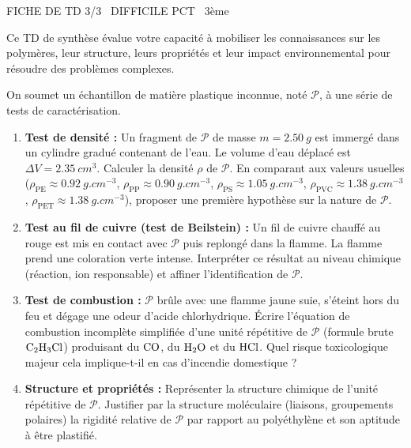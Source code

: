\documentclass[11pt]{article}
\begin{document}
\begin{tcolorbox}[enhanced,colback=popink,colframe=popink,arc=10pt,boxrule=0pt,left=12pt,right=12pt,top=9pt,bottom=9pt]
{\color{white}\popxbold\small FICHE DE TD 3/3 \textbullet\ DIFFICILE \hfill PCT \textbullet\ 3ème\par}
\end{tcolorbox}
\vspace{4pt}
Ce TD de synthèse évalue votre capacité à mobiliser les connaissances sur les polymères, leur structure, leurs propriétés et leur impact environnemental pour résoudre des problèmes complexes.

\begin{exercice}
On soumet un échantillon de matière plastique inconnue, noté $\mathcal{P}$, à une série de tests de caractérisation.
\begin{enumerate}
    \item \textbf{Test de densité :} Un fragment de $\mathcal{P}$ de masse $m = \SI{2,50}{g}$ est immergé dans un cylindre gradué contenant de l'eau. Le volume d'eau déplacé est $\Delta V = \SI{2,35}{cm^3}$. Calculer la densité $\rho$ de $\mathcal{P}$. En comparant aux valeurs usuelles ($\rho_{\text{PE}} \approx \SI{0,92}{g.cm^{-3}}$, $\rho_{\text{PP}} \approx \SI{0,90}{g.cm^{-3}}$, $\rho_{\text{PS}} \approx \SI{1,05}{g.cm^{-3}}$, $\rho_{\text{PVC}} \approx \SI{1,38}{g.cm^{-3}}$, $\rho_{\text{PET}} \approx \SI{1,38}{g.cm^{-3}}$), proposer une première hypothèse sur la nature de $\mathcal{P}$.
    \item \textbf{Test au fil de cuivre (test de Beilstein) :} Un fil de cuivre chauffé au rouge est mis en contact avec $\mathcal{P}$ puis replongé dans la flamme. La flamme prend une coloration verte intense. Interpréter ce résultat au niveau chimique (réaction, ion responsable) et affiner l'identification de $\mathcal{P}$.
    \item \textbf{Test de combustion :} $\mathcal{P}$ brûle avec une flamme jaune suie, s'éteint hors du feu et dégage une odeur d'acide chlorhydrique. Écrire l'équation de combustion incomplète simplifiée d'une unité répétitive de $\mathcal{P}$ (formule brute $\ce{C2H3Cl}$) produisant du $\ce{CO}$, du $\ce{H2O}$ et du $\ce{HCl}$. Quel risque toxicologique majeur cela implique-t-il en cas d'incendie domestique ?
    \item \textbf{Structure et propriétés :} Représenter la structure chimique de l'unité répétitive de $\mathcal{P}$. Justifier par la structure moléculaire (liaisons, groupements polaires) la rigidité relative de $\mathcal{P}$ par rapport au polyéthylène et son aptitude à être plastifié.
\end{enumerate}
\end{exercice}
\end{document}

